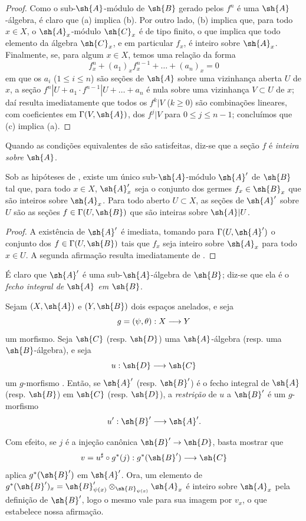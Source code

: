 \documentclass[oneside,10pt]{amsart}
\makeatletter
\renewcommand{\leq}{\leqslant}
\renewcommand{\geq}{\geqslant}
\newcommand{\ega@arrow}[2]{\mathchoice{#1}{#2}{#2}{#2}}
\renewcommand{\to}{\ega@arrow{\longrightarrow}{\rightarrow}}
\newcommand{\oldpage}[2][]{\marginnote{\normalfont\footnotesize\textbf{#1}~|~#2}\ignorespaces}
\let\EGAOriginalLabel\label
\renewcommand{\label}[1]{\phantomsection\EGAOriginalLabel{#1}}
\makeatother
\begin{document}
\oldpage[II]{117}
\begin{proof}
Como o sub-$\sh{A}$-módulo de $\sh{B}$ gerado pelos $f^n$ é uma $\sh{A}$-álgebra, é claro que (a) implica (b).
Por outro lado, (b) implica que, para todo $x\in X$, o $\sh{A}_x$-módulo $\sh{C}_x$ é de tipo finito, o que implica que todo elemento da álgebra $\sh{C}_x$, e em particular $f_x$, é inteiro sobre $\sh{A}_x$.
Finalmente, se, para algum $x\in X$, temos uma relação da forma
\[
  f_x^n+(a_1)_xf_x^{n-1}+\ldots+(a_n)_x=0
\]
em que os $a_i$ ($1\leq i\leq n$) são seções de $\sh{A}$ sobre uma vizinhança aberta $U$ de $x$, a seção $f^n|U+a_1\cdot f^{n-1}|U+\ldots+a_n$ é nula sobre uma vizinhança $V\subset U$ de $x$;
daí resulta imediatamente que todos os $f^k|V$ ($k\geq0$) são combinações lineares, com coeficientes em $\Gamma(V,\sh{A})$, dos $f^j|V$ para $0\leq j\leq n-1$;
concluímos que (c) implica (a).
\end{proof}

Quando as condições equivalentes de  são satisfeitas, diz-se que a seção $f$ é \emph{inteira sobre $\sh{A}$}.

\begin{corollary}[6.3.2]
\label{II.6.3.2}
Sob as hipóteses de , existe um único sub-$\sh{A}$-módulo $\sh{A}'$ de $\sh{B}$ tal que, para todo $x\in X$, $\sh{A}'_x$ seja o conjunto dos germes $f_x\in\sh{B}_x$ que são inteiros sobre $\sh{A}_x$.
Para todo aberto $U\subset X$, as seções de $\sh{A}'$ sobre $U$ são as seções $f\in\Gamma(U,\sh{B})$ que são inteiras sobre $\sh{A}|U$.
\end{corollary}

\begin{proof}
A existência de $\sh{A}'$ é imediata, tomando para $\Gamma(U,\sh{A}')$ o conjunto dos $f\in\Gamma(U,\sh{B})$ tais que $f_x$ seja inteiro sobre $\sh{A}_x$ para todo $x\in U$.
A segunda afirmação resulta imediatamente de .
\end{proof}

É claro que $\sh{A}'$ é uma sub-$\sh{A}$-álgebra de $\sh{B}$;
diz-se que ela é o \emph{fecho integral de $\sh{A}$ em $\sh{B}$}.

\begin{env}[6.3.3]
\label{II.6.3.3}
Sejam $(X,\sh{A})$ e $(Y,\sh{B})$ dois espaços anelados, e seja
\[
  g=(\psi,\theta):X\to Y
\]
um morfismo.
Seja $\sh{C}$ (resp. $\sh{D}$) uma $\sh{A}$-álgebra (resp. uma $\sh{B}$-álgebra), e seja
\[
  u:\sh{D}\to\sh{C}
\]
um $g$-morfismo .
Então, se $\sh{A}'$ (resp. $\sh{B}'$) é o fecho integral de $\sh{A}$ (resp. $\sh{B}$) em $\sh{C}$ (resp. $\sh{D}$), a \emph{restrição} de $u$ a $\sh{B}'$ é um $g$-morfismo
\[
  u':\sh{B}'\to\sh{A}'.
\]

Com efeito, se $j$ é a injeção canônica $\sh{B}'\to\sh{D}$, basta mostrar que
\[
  v=u^\sharp\circ g^*(j):g^*(\sh{B}')\to\sh{C}
\]
aplica $g^*(\sh{B}')$ em $\sh{A}'$.
Ora, um elemento de $g^*(\sh{B}')_x=\sh{B}'_{\psi(x)}\otimes_{\sh{B}_{\psi(x)}}\sh{A}_x$ é inteiro sobre $\sh{A}_x$ pela definição de $\sh{B}'$, logo o mesmo vale para sua imagem por $v_x$, o que estabelece nossa afirmação.
\end{env}
\end{document}
